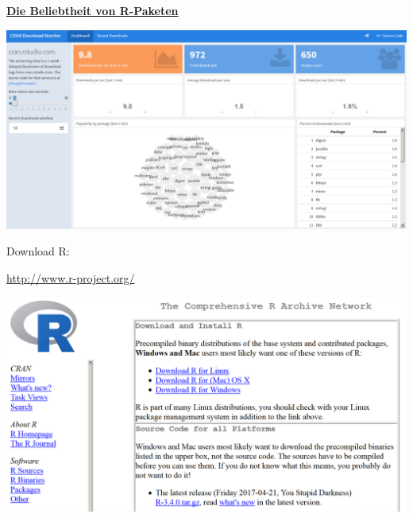 \documentclass[ignorenonframetext,]{beamer}
\begin{document}
\begin{frame}{\href{https://gallery.shinyapps.io/cran-gauge/}{\textbf{Die
Beliebtheit von R-Paketen}}}
\protect\hypertarget{die-beliebtheit-von-r-paketen}{}

\includegraphics{figure/CRANdownloads.PNG}

\end{frame}

\begin{frame}{Download R:}
\protect\hypertarget{download-r}{}

\url{http://www.r-project.org/}

\includegraphics{figure/CRAN1picture.PNG}

\end{frame}
\end{document}
